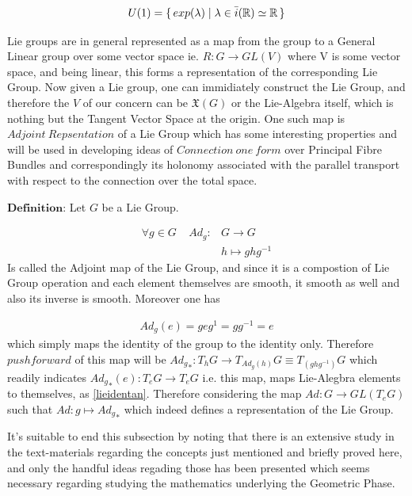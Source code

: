 \documentclass[8pt, twocoloumn]{article}
\begin{document}
\begin{align}
U(1) = \set{ exp(\lambda) |  \lambda \in \bar{i}(\mathbb{R}) \simeq \mathbb{R}}
\end{align}

Lie groups are in general represented as a map from the group to a General Linear group over some vector space ie. $R: G \to GL(V)$ where V is some vector space, and being linear, this forms a representation of the corresponding Lie Group. Now given a Lie group, one can immidiately construct the Lie Group, and therefore the $V$ of our concern can be $\mathfrak{X}(G)$ or the Lie-Algebra itself, which is nothing  but the Tangent Vector Space at the origin. One such map is $Adjoint \ Repsentation$ of a Lie Group which has some interesting properties and will be used in developing ideas of $Connection \ one \ form$ over Principal Fibre Bundles and correspondingly its holonomy associated with the parallel transport with respect to the connection over the total space.

$\textbf{Definition:}$ Let $G$ be a Lie Group. 

\begin{align}
    \forall g \in G \ \ \ \ \ Ad_g :& G \to G \\ 
    & h \mapsto g h g^{-1}
\end{align}
Is called the Adjoint map of the Lie Group, and since it is a compostion of Lie Group operation and each element themselves are smooth, it smooth as well and also its inverse is smooth. Moreover one has 

\begin{align}
    Ad_g(e) = geg^{1} = gg^{-1} = e
\end{align}
which simply maps the identity of the group to the identity only. Therefore $pushforward$ of this map will be ${Ad_{g}}_{*}: T_hG \to T_{{Ad_{g}(h)}}G \equiv   T_{(ghg^{-1})}G${\label{adjointmap}} which readily indicates ${Ad_{g}}_{*}(e): T_{e}G \to T_{e}G$ i.e. this map, maps Lie-Alegbra elements to themselves, as \ref{lieidentan}. Therefore considering the map $Ad: G \to GL(T_eG)$ such that $Ad: g \mapsto {Ad_g}_{*}$ which indeed defines a representation of the Lie Group. 

It's suitable to end this subsection by noting that there is an extensive study in the text-materials regarding the concepts just mentioned and briefly proved here, and only the handful ideas regading those has been presented which seems necessary regarding studying the mathematics underlying the Geometric Phase.
\end{document}
